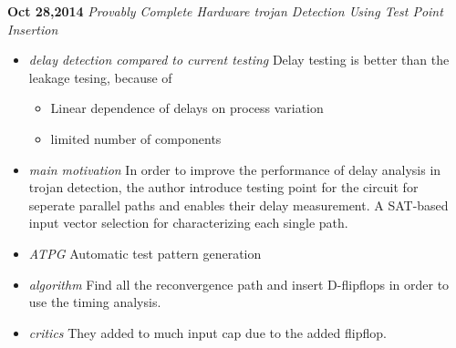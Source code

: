 \documentclass[]{article}
\begin{document}
\noindent \textbf{Oct 28,2014}
\textit{Provably Complete Hardware trojan Detection Using Test Point Insertion}
\indent		\begin{itemize}
            \item \textit{delay detection compared to current testing} Delay
            testing is better than the leakage tesing, because of 
                \begin{itemize}
                    \item Linear dependence of delays on process variation
                    \item limited number of components
                \end{itemize}
            \item \textit{main motivation} In order to improve the performance
            of delay analysis in trojan detection, the author introduce testing
            point for the circuit for seperate parallel paths and enables their
            delay measurement.  A SAT-based input vector selection for
            characterizing each single path.
            \item \textit{ATPG} Automatic test pattern generation
            \item \textit{algorithm} Find all the reconvergence path and insert
            D-flipflops in order to use the timing analysis.
            \item \textit{critics} They added to much input cap due to the
            added flipflop.
       		\end{itemize}
\end{document}
